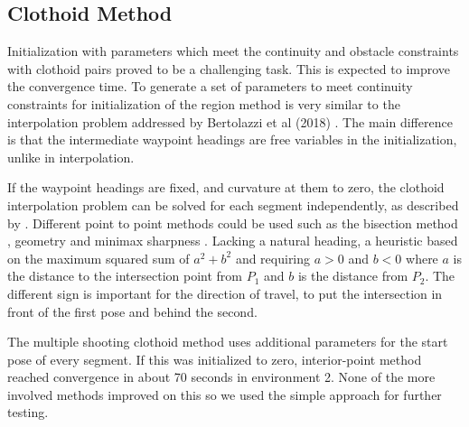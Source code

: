 \subsection{Clothoid Method}
Initialization with parameters which meet the continuity and obstacle constraints with clothoid pairs proved to be a challenging task. This is expected to improve the convergence time. To generate a set of parameters to meet continuity constraints for initialization of the region method is very similar to the interpolation problem addressed by Bertolazzi et al (2018) \cite{Bertolazzi2018}. The main difference is that the intermediate waypoint headings are free variables in the initialization, unlike in interpolation.

If the waypoint headings are fixed, and curvature at them to zero, the clothoid interpolation problem can be solved for each segment independently, as described by \cite{Gim2017a}. Different point to point methods could be used such as the bisection method \cite{Gim2017b}, geometry \cite{Vazquez-Mendez2016} and minimax sharpness \cite{Henrie2007}. Lacking a natural heading, a heuristic based on the maximum squared sum of $a^2 + b^2$ and requiring $a>0$ and $b<0$ where $a$ is the distance to the intersection point from $P_1$ and $b$ is the distance from $P_2$. The different sign is important for the direction of travel, to put the intersection in front of the first pose and behind the second.

The multiple shooting clothoid method uses additional parameters for the start pose of every segment. If this was initialized to zero, interior-point method reached convergence in about 70 seconds in environment 2. None of the more involved methods improved on this so we used the simple approach for further testing.  

